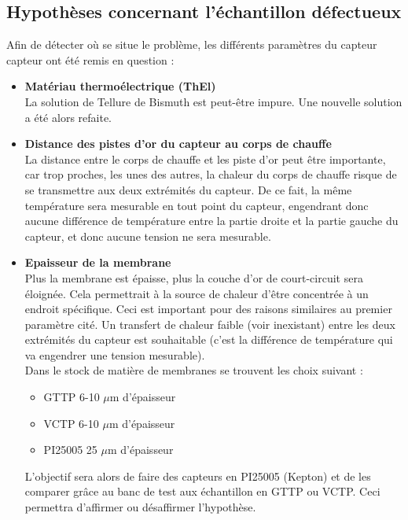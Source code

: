 \subsection{Hypothèses concernant l'échantillon défectueux}
Afin de détecter où se situe le problème, les différents paramètres du capteur \gls{capteur} ont été remis en question :
\begin{itemize}
    \item \textbf{Matériau thermoélectrique (ThEl)}\\
          La solution de Tellure de Bismuth est peut-être impure. Une nouvelle solution a été alors refaite.
          
    \item \textbf{Distance des pistes d'or du capteur au corps de chauffe}\\
          La distance entre le corps de chauffe et les piste d'or peut être importante, car trop proches, les unes des autres, la chaleur du corps
          de chauffe risque de se transmettre aux deux extrémités du capteur. De ce fait, la même température sera mesurable en tout point du
          capteur, engendrant donc aucune différence de température entre la partie droite et la partie gauche du \gls{capteur}, et donc aucune
          tension ne sera mesurable.\\
          
    \item \textbf{Epaisseur de la membrane} \\
          Plus la membrane est épaisse, plus la couche d'or de court-circuit sera éloignée. Cela permettrait à la source de chaleur d'être concentrée
          à un endroit spécifique. Ceci est important pour des raisons similaires au premier paramètre cité. Un transfert de chaleur faible (voir
          inexistant) entre les deux extrémités du \gls{capteur} est souhaitable (c'est la différence de température qui va engendrer une tension
          mesurable). \\
          
          Dans le stock de matière de membranes se trouvent les choix suivant :
          \begin{itemize}
              \item GTTP 6-10 $\mu$m d'épaisseur
              \item VCTP 6-10 $\mu$m d'épaisseur
              \item PI25005 25 $\mu$m d'épaisseur
          \end{itemize}
          L'objectif sera alors de faire des capteurs en PI25005 (Kepton) et de les comparer grâce au banc de test aux échantillon en GTTP ou VCTP.
          Ceci permettra d'affirmer ou désaffirmer l'hypothèse.\\
          

\end{itemize}
